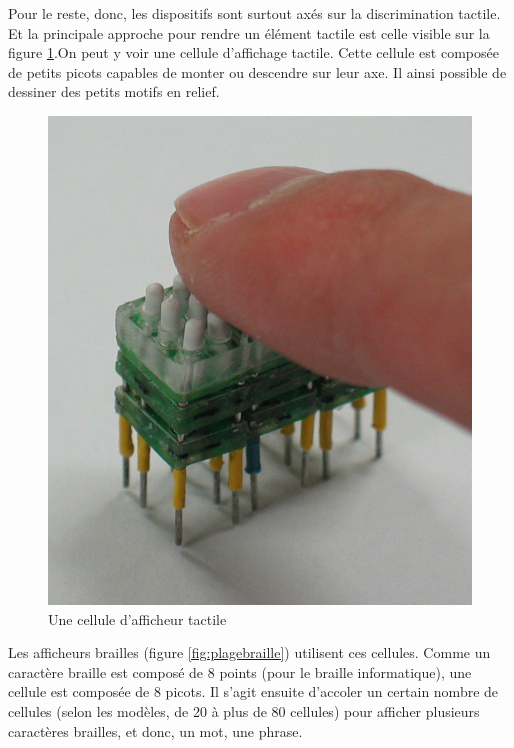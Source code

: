 \documentclass[
]{book}
\begin{document}
Pour le reste, donc, les dispositifs sont surtout axés sur la
discrimination tactile. Et la principale approche pour rendre un élément
tactile est celle visible sur la figure \ref{fig:afficheur}.On peut y voir
une cellule d'affichage tactile. Cette cellule est composée de petits picots
capables de monter ou descendre sur leur axe. Il ainsi possible de dessiner
des petits motifs en relief.

\begin{figure}
\centering
\includegraphics{img/braille_cell3.jpg}
\caption{\label{fig:afficheur}Une cellule d'afficheur tactile}
\end{figure}

Les afficheurs brailles (figure \ref{fig:plagebraille}) utilisent
ces cellules. Comme un caractère
braille est composé de 8 points (pour le braille informatique), une cellule
est composée de 8 picots. Il s'agit ensuite d'accoler un certain nombre de
cellules (selon les modèles, de 20 à plus de 80 cellules) pour afficher
plusieurs caractères brailles, et donc, un mot, une phrase.
\end{document}
